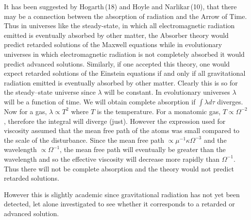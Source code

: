 It has been suggested by Hogarth\,(18) and Hoyle and Narlikar\,(10), 
that there may be a connection between the absorption of radiation 
and the Arrow of Time. Thus in universes like the steady-state, in 
which all electromagnetic radiation emitted is eventually absorbed by 
other matter, the Absorber theory would predict retarded solutions of the Maxwell equations while in evolutionary universes in which 
electromagnetic radiation is not completely absorbed it would predict 
advanced solutions. Similarly, if one accepted this theory, one would 
expect retarded solutions of the Einstein equations if and only if all 
gravitational radiation emitted is eventually absorbed by other matter. 
Clearly this is so for the steady–state universe since $\lambda$ will be 
constant. In evolutionary universes $\lambda$ will be a function of time.  
We will obtain complete absorption if $\int \lambda d\tau$ diverges. Now for a gas, 
$\lambda \propto T^{2}$ where $T$ is the temperature. For a monatomic gas, $T \propto \Omega^{-2}$, 
therefore the integral will diverge (just). However the expression 
used for viscosity assumed that the mean free path of the atoms was 
small compared to the scale of the disturbance. Since the mean free 
path $\propto \mu^{-1}\kappa \Omega^{-3}$ and the wavelength $\propto \Omega^{-1}$, the mean free path will 
eventually be greater than the wavelength and so the effective viscosity 
will decrease more rapidly than $\Omega^{-1}$. Thus there will not be complete 
absorption and the theory would not predict retarded solutions.  

However this is slightly academic since gravitational radiation has not 
yet been detected, let alone investigated to see whether it corresponds 
to a retarded or advanced solution.


